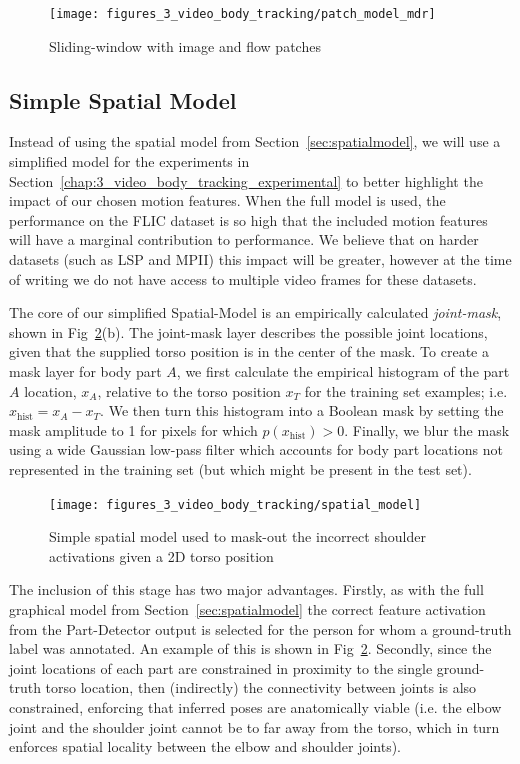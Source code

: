 \begin{figure}[ht]
\centering
    \texttt{[image: figures\_3\_video\_body\_tracking/patch\_model\_mdr]}
    \caption{Sliding-window with image and flow patches}
  \label{fig:multiResPatchModel_video}
\end{figure}

\subsection{Simple Spatial Model}
\label{sec:spatialModel}

Instead of using the spatial model from Section~\ref{sec:spatialmodel}, we will use a simplified model for the experiments in Section~\ref{chap:3_video_body_tracking_experimental} to better highlight the impact of our chosen motion features.  When the full model is used, the performance on the FLIC dataset is so high that the included motion features will have a marginal contribution to performance. We believe that on harder datasets (such as LSP and MPII) this impact will be greater, however at the time of writing we do not have access to multiple video frames for these datasets.

The core of our simplified Spatial-Model is an empirically calculated \emph{joint-mask}, shown in Fig~\ref{fig:spatialModel}(b). The joint-mask layer describes the possible joint locations, given that the supplied torso position is in the center of the mask.  To create a mask layer for body part $A$, we first calculate the empirical histogram of the part $A$ location, $x_A$, relative to the torso position $x_T$ for the training set examples; i.e. $x_{\text{hist}}=x_A-x_T$.  We then turn this histogram into a Boolean mask by setting the mask amplitude to 1 for pixels for which $p\left(x_{\text{hist}}\right) > 0$. Finally, we blur the mask using a wide Gaussian low-pass filter which accounts for body part locations not represented in the training set (but which might be present in the test set).

\begin{figure}[ht]
  \centering
    \texttt{[image: figures\_3\_video\_body\_tracking/spatial\_model]}
    \caption{Simple spatial model used to mask-out the incorrect shoulder activations given a 2D torso position}
  \label{fig:spatialModel}
\end{figure}

The inclusion of this stage has two major advantages.  Firstly, as with the full graphical model from Section~\ref{sec:spatialmodel} the correct feature activation from the Part-Detector output is selected for the person for whom a ground-truth label was annotated.  An example of this is shown in Fig~\ref{fig:spatialModel}. Secondly, since the joint locations of each part are constrained in proximity to the single ground-truth torso location, then (indirectly) the connectivity between joints is also constrained, enforcing that inferred poses are anatomically viable (i.e. the elbow joint and the shoulder joint cannot be to far away from the torso, which in turn enforces spatial locality between the elbow and shoulder joints).

